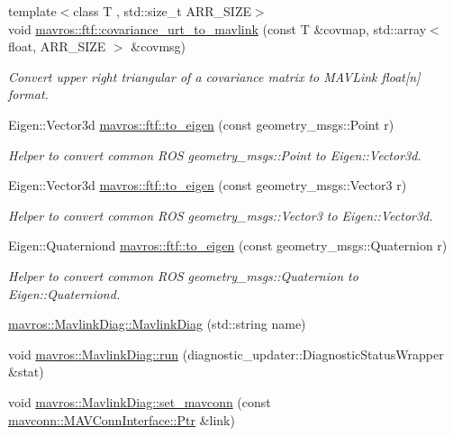 \begin{DoxyCompactItemize}
{\footnotesize template$<$class T , std\+::size\+\_\+t A\+R\+R\+\_\+\+S\+I\+ZE$>$ }\\void \mbox{\hyperlink{group__nodelib_ga70fe3c62c321522cd8786aa9ca163e2b}{mavros\+::ftf\+::covariance\+\_\+urt\+\_\+to\+\_\+mavlink}} (const T \&covmap, std\+::array$<$ float, A\+R\+R\+\_\+\+S\+I\+ZE $>$ \&covmsg)
\begin{DoxyCompactList}\small\item\em Convert upper right triangular of a covariance matrix to M\+A\+V\+Link float\mbox{[}n\mbox{]} format. \end{DoxyCompactList}\item 
Eigen\+::\+Vector3d \mbox{\hyperlink{group__nodelib_ga2bd453f7d2dafb3814b5312e788e2e35}{mavros\+::ftf\+::to\+\_\+eigen}} (const geometry\+\_\+msgs\+::\+Point r)
\begin{DoxyCompactList}\small\item\em Helper to convert common R\+OS geometry\+\_\+msgs\+::\+Point to Eigen\+::\+Vector3d. \end{DoxyCompactList}\item 
Eigen\+::\+Vector3d \mbox{\hyperlink{group__nodelib_gaa967b677c7a130cb95621988a4987fab}{mavros\+::ftf\+::to\+\_\+eigen}} (const geometry\+\_\+msgs\+::\+Vector3 r)
\begin{DoxyCompactList}\small\item\em Helper to convert common R\+OS geometry\+\_\+msgs\+::\+Vector3 to Eigen\+::\+Vector3d. \end{DoxyCompactList}\item 
Eigen\+::\+Quaterniond \mbox{\hyperlink{group__nodelib_gab3357177e153e9bc233d96ac595c6a5f}{mavros\+::ftf\+::to\+\_\+eigen}} (const geometry\+\_\+msgs\+::\+Quaternion r)
\begin{DoxyCompactList}\small\item\em Helper to convert common R\+OS geometry\+\_\+msgs\+::\+Quaternion to Eigen\+::\+Quaterniond. \end{DoxyCompactList}\item 
\mbox{\hyperlink{group__nodelib_ga7e52b64de8101152cb7da231bb6f0e6b}{mavros\+::\+Mavlink\+Diag\+::\+Mavlink\+Diag}} (std\+::string name)
\item 
void \mbox{\hyperlink{group__nodelib_gae5789a005615261233f253b00366693a}{mavros\+::\+Mavlink\+Diag\+::run}} (diagnostic\+\_\+updater\+::\+Diagnostic\+Status\+Wrapper \&stat)
\item 
void \mbox{\hyperlink{group__nodelib_gaac672d37b57dc4d73ec73de04ea436ed}{mavros\+::\+Mavlink\+Diag\+::set\+\_\+mavconn}} (const \mbox{\hyperlink{group__mavconn_gaff41078b805e1d8f85ed6fd2d87711ce}{mavconn\+::\+M\+A\+V\+Conn\+Interface\+::\+Ptr}} \&link)

\end{DoxyCompactItemize}
